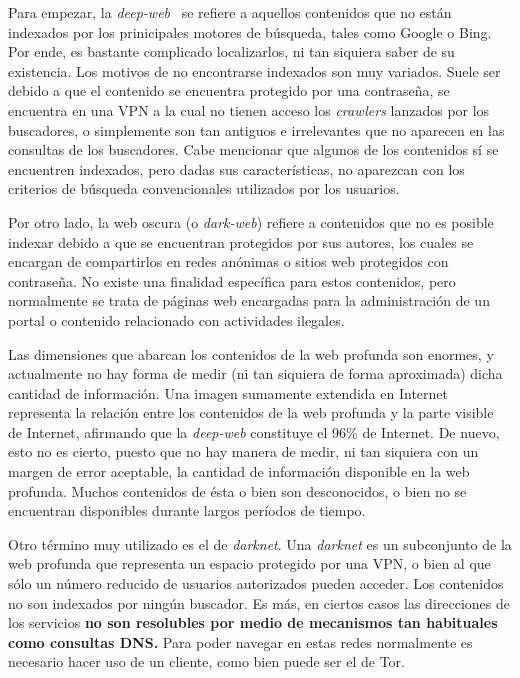 Para empezar, la \textit{deep-web}~\cite{article:deepweb} se refiere a aquellos contenidos que no están indexados por los prinicipales motores de búsqueda, tales como Google o Bing. Por ende, es bastante complicado localizarlos, ni tan siquiera saber de su existencia.
Los motivos de no encontrarse indexados son muy variados. Suele ser debido a que el contenido se encuentra protegido por una contraseña, se encuentra en una VPN a la cual no tienen acceso los \textit{crawlers} lanzados por los buscadores, o simplemente son tan antiguos e irrelevantes que no aparecen en las consultas de los buscadores.
Cabe mencionar que algunos de los contenidos sí se encuentren indexados, pero dadas sus características, no aparezcan con los criterios de búsqueda convencionales utilizados por los usuarios.

Por otro lado, la web oscura (o \textit{dark-web}) refiere a contenidos que no es posible indexar debido a que se encuentran protegidos por sus autores, los cuales se encargan de compartirlos en redes anónimas o sitios web protegidos con contraseña. 
No existe una finalidad específica para estos contenidos, pero normalmente se trata de páginas web encargadas para la administración de un portal o contenido relacionado con actividades ilegales.

Las dimensiones que abarcan los contenidos de la web profunda son enormes, y actualmente no hay forma de medir (ni tan siquiera de forma aproximada)	dicha cantidad de información.
Una imagen sumamente extendida en Internet representa la relación entre los contenidos de la web profunda y la parte visible de Internet, afirmando que la \textit{deep-web} constituye el 96\% de Internet. De nuevo, esto no es cierto, puesto que no hay manera de medir, ni tan siquiera con un margen de error aceptable, la cantidad de información disponible en la web profunda. Muchos contenidos de ésta o bien son desconocidos, o bien no se encuentran disponibles durante largos períodos de tiempo.

Otro término muy utilizado es el de \textit{darknet}. Una \textit{darknet }es un subconjunto de la web profunda que representa un espacio protegido por una VPN, o bien al que sólo un número reducido de usuarios autorizados pueden acceder. Los contenidos no son indexados por ningún buscador. Es más, en ciertos casos las direcciones de los servicios \textbf{no son resolubles por medio de mecanismos tan habituales como consultas DNS.} Para poder navegar en estas redes normalmente es necesario hacer uso de un cliente, como bien puede ser el de Tor.

